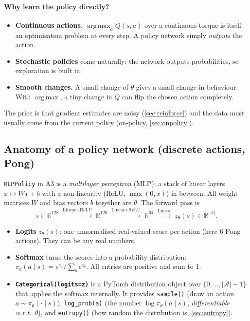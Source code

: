 \documentclass[11pt,a4paper]{article}
\DeclareMathOperator{\argmax}{arg\,max}
\newcommand{\R}{\mathbb{R}}
\newcommand{\pit}{\pi_\theta}
\newcommand{\code}[1]{\texttt{#1}}
\begin{document}
\paragraph{Why learn the policy directly?}
\begin{itemize}[nosep]
  \item \textbf{Continuous actions.} $\argmax_a Q(s,a)$ over a continuous torque is itself an optimisation problem at every step. A policy network simply \emph{outputs} the action.
  \item \textbf{Stochastic policies} come naturally: the network outputs probabilities, so exploration is built in.
  \item \textbf{Smooth changes.} A small change of $\theta$ gives a small change in behaviour. With $\argmax$, a tiny change in $Q$ can flip the chosen action completely.
\end{itemize}
The price is that gradient estimates are noisy (\cref{sec:reinforce}) and the data must usually come from the current policy (on-policy, \cref{sec:onpolicy}).

\subsection{Anatomy of a policy network (discrete actions, Pong)}
\code{MLPPolicy} in A3 is a \emph{multilayer perceptron} (MLP): a stack of linear layers $x\mapsto Wx+b$ with a non-linearity (ReLU, $\max(0,x)$) in between. All weight matrices $W$ and bias vectors $b$ together are $\theta$. The forward pass is
\[
  s\in\R^{128}\;\xrightarrow{\text{Linear+ReLU}}\;\R^{128}\;\xrightarrow{\text{Linear+ReLU}}\;\R^{64}\;\xrightarrow{\text{Linear}}\;z_\theta(s)\in\R^{|\mathcal A|}.
\]
\begin{itemize}[nosep]
  \item \textbf{Logits} $z_\theta(s)$: one unnormalised real-valued score per action (here 6 Pong actions). They can be any real numbers.
  \item \textbf{Softmax} turns the scores into a probability distribution: $\pit(a\mid s)=e^{z_a}/\sum_b e^{z_b}$. All entries are positive and sum to 1.
  \item \textbf{\code{Categorical(logits=z)}} is a PyTorch distribution object over $\{0,\dots,|\mathcal A|-1\}$ that applies the softmax internally. It provides
    \code{sample()} (draw an action $a\sim\pit(\cdot\mid s)$),
    \code{log\_prob(a)} (the number $\log\pit(a\mid s)$, \emph{differentiable w.r.t.\ $\theta$}),
    and \code{entropy()} (how random the distribution is, \cref{sec:entropy}).
\end{itemize}
\end{document}
